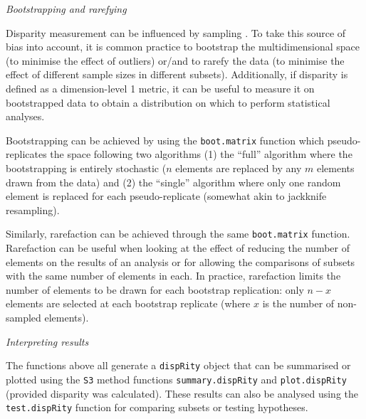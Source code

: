 \documentclass[12pt,letterpaper]{article}
\renewcommand{\subsection}[1]{%
\bigskip
\begin{center}
\begin{large}
\normalfont\itshape #1
\end{large}
\end{center}}
\newcommand{\disp}{\texttt{dispRity} }
\begin{document}
\subsection{Bootstrapping and rarefying}
Disparity measurement can be influenced by sampling \citep{Butler2012}.
To take this source of bias into account, it is common practice to bootstrap the multidimensional space (to minimise the effect of outliers) or/and to rarefy the data (to minimise the effect of different sample sizes in different subsets).
Additionally, if disparity is defined as a dimension-level 1 metric, it can be useful to measure it on bootstrapped data to obtain a distribution on which to perform statistical analyses.

Bootstrapping can be achieved by using the \texttt{boot.matrix} function which pseudo-replicates the space following two algorithms (1) the ``full'' algorithm where the bootstrapping is entirely stochastic ($n$ elements are replaced by any $m$ elements drawn from the data) and (2) the ``single'' algorithm where only one random element is replaced for each pseudo-replicate (somewhat akin to jackknife resampling).

Similarly, rarefaction can be achieved through the same \texttt{boot.matrix} function.
Rarefaction can be useful when looking at the effect of reducing the number of elements on the results of an analysis or for allowing the comparisons of subsets with the same number of elements in each.
In practice, rarefaction limits the number of elements to be drawn for each bootstrap replication: only $n-x$ elements are selected at each bootstrap replicate (where $x$ is the number of non-sampled elements).

\subsection{Interpreting results}
The functions above all generate a \disp object that can be summarised or plotted using the \texttt{S3} method functions \texttt{summary.dispRity} and \texttt{plot.dispRity} (provided disparity was calculated).
These results can also be analysed using the \texttt{test.dispRity} function for comparing subsets or testing hypotheses.
\end{document}
